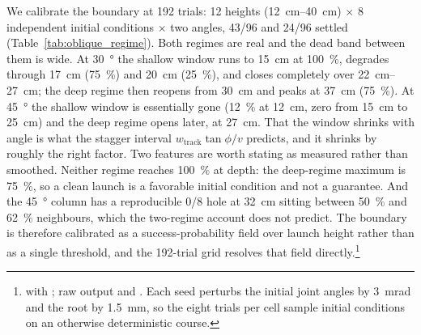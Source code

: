 \documentclass[conference]{IEEEtran}
\begin{document}
We calibrate the boundary at \num{192} trials: \num{12} heights
(\SIrange{12}{40}{cm}) ${\times}$ \num{8} independent initial conditions
${\times}$ two angles, \num{43}/\num{96} and \num{24}/\num{96} settled
(Table~\ref{tab:oblique_regime}). Both regimes are real and the dead band
between them is wide. At \SI{30}{\degree} the shallow window runs to
\SI{15}{cm} at \SI{100}{\percent}, degrades through \SI{17}{cm}
(\SI{75}{\percent}) and \SI{20}{cm} (\SI{25}{\percent}), and closes completely
over \SIrange{22}{27}{cm}; the deep regime then reopens from \SI{30}{cm} and
peaks at \SI{37}{cm} (\SI{75}{\percent}). At \SI{45}{\degree} the shallow window is essentially gone (\SI{12}{\percent} at \SI{12}{cm}, zero from \SI{15}{cm} to \SI{25}{cm}) and the deep regime opens later, at \SI{27}{cm}. That the window
shrinks with angle is what the stagger interval $w_{\text{track}}\tan\phi/v$
predicts, and it shrinks by roughly the right factor.
Two features are worth stating as measured rather than smoothed. Neither regime
reaches \SI{100}{\percent} at depth: the deep-regime maximum is
\SI{75}{\percent}, so a clean launch is a favorable initial condition and not a
guarantee. And the \SI{45}{\degree} column has a reproducible \num{0}/\num{8}
hole at \SI{32}{cm} sitting between \SI{50}{\percent} and \SI{62}{\percent}
neighbours, which the two-regime account does not predict. The boundary is
therefore calibrated as a success-probability field over launch height rather
than as a single threshold, and the \num{192}-trial grid resolves that field
directly.\footnote{
with ; raw output  and
. Each seed perturbs the initial joint angles by
\SI{3}{mrad} and the root by \SI{1.5}{mm}, so the eight trials per cell sample
initial conditions on an otherwise deterministic course.}
\end{document}
